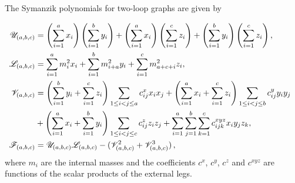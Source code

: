 \documentclass[12pt,a4paper]{article}
\theoremstyle{plain}
\theoremstyle{remark}
\newcommand{\cU}{\mathscr {U}}
\newcommand{\cF}{\mathscr {F}}
\newcommand{\cV}{\mathscr {V}}
\newcommand{\cL}{\mathscr {L}}
\begin{document}
		The Symanzik polynomials for two-loop graphs are given by
		
		
		\begin{align}\label{eq:UVFtwolop}
			\cU_{(a,b,c)} & = \left(\sum_{i=1}^ax_i \right) \left( \sum_{i=1}^b
			y_i\right) + \left(\sum_{i=1}^ax_i \right)  \left(
			\sum_{i=1}^c z_i \right) +  \left( \sum_{i=1}^b
			y_i\right)  \left( \sum_{i=1}^c z_i \right) ,\cr
			\cL_{(a,b,c)}&=\sum_{i=1}^a m_{i}^2 x_i + \sum_{i=1}^b m^2_{i+a} y_i
			+\sum_{i=1}^c  m^2_{a+c+i} z_i,\cr
			\cV_{(a,b,c)} & =  \left( \sum_{i=1}^b
			y_i+ \sum_{i=1}^c z_i \right)\sum_{1\leq
                                        i<j\leq a} c^{x}_{ij} x_ix_j
                                        + \left( \sum_{i=1}^a
                                        x_i                                             + \sum_{i=1}^c z_i \right)\sum_{1\leq
                                        i<j\leq b} c^y_{ij} y_iy_j\cr
                                        &+ \left( \sum_{i=1}^a
			x_i+ \sum_{i=1}^b y_i \right)\sum_{1\leq
				i<j\leq c} c^z_{ij} z_iz_j
			 +\sum_{i=1}^a\sum_{j=1}^b\sum_{k=1}^c c^{xyz}_{ijk} x_iy_jz_k,\cr                  
			\ \cF_{(a,b,c)} & = \cU_{(a,b,c)}\cL_{(a,b,c)} - (\cV^2_{(a,b,c)}+\cV^3_{(a,b,c)}) \,,
		\end{align}
		where $m_i$ are the internal masses and the coefficients $c^x$,
		$c^y$, $c^z$ and $c^{xyz}$ are functions of the scalar products of the
		external legs.

\end{document}
